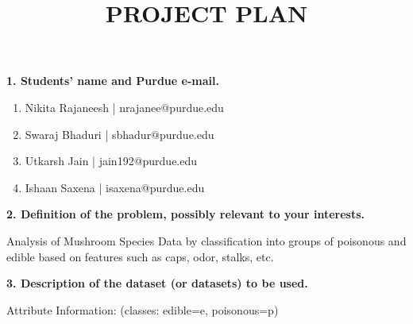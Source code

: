 \documentclass[10pt,letterpaper]{article}
\title{\textbf{PROJECT PLAN}}
\author{\vspace{-0.6in}}
\date{\vspace{-0.6in}}
\newcommand{\somespace}{\vspace{0.075in}}
\begin{document}
\maketitle

\noindent \textbf{1. Students' name and Purdue e-mail.}
\somespace

\begin{enumerate}[label=\alph*.]
    \item Nikita Rajaneesh | nrajanee@purdue.edu
    \item Swaraj Bhaduri | sbhadur@purdue.edu
    \item Utkarsh Jain | jain192@purdue.edu
    \item Ishaan Saxena | isaxena@purdue.edu
\end{enumerate}

\somespace
\noindent \textbf{2. Definition of the problem, possibly relevant to your interests.}
\somespace

Analysis of Mushroom Species Data by classification into groups of poisonous and edible
based on features such as caps, odor, stalks, etc.

\somespace
\noindent \textbf{3. Description of the dataset (or datasets) to be used.}
\somespace

Attribute Information: (classes: edible=e, poisonous=p)
\end{document}
